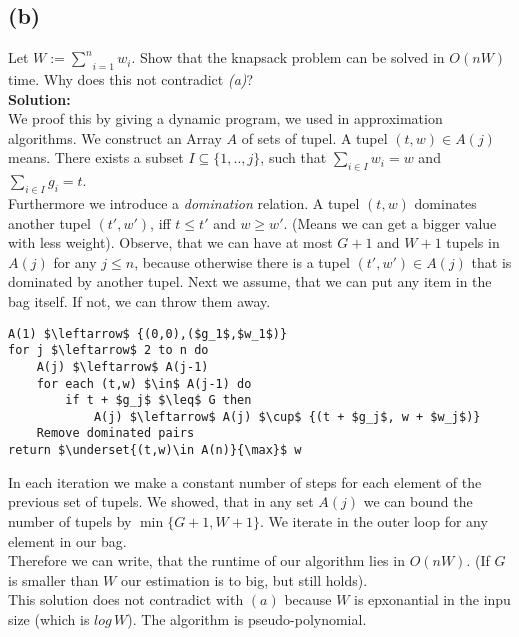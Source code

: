 \subsection*{(b)}

Let $W := \underset{i=1}{\overset{n}{\sum}} w_i$. Show that the knapsack problem can be solved in $O(nW)$ time. Why does this not
contradict \emph{(a)}?\\

\textbf{Solution:}\\
We proof this by giving a dynamic program, we used in approximation algorithms.
We construct an Array $A$ of sets of tupel. A tupel $(t,w) \in A(j)$ means. There exists a 
subset $I \subseteq \{1,..,j \}$, such that $\underset{i \in I}{\sum} w_i = w$ and $\underset{i \in I}{\sum} g_i = t$.\\

Furthermore we introduce a \emph{domination} relation. A tupel $(t,w)$ dominates another tupel $(t',w')$, iff $t \leq t'$ and $w \geq w'$.
(Means we can get a bigger value with less weight).
Observe, that we can have at most $G+1$ and $W+1$ tupels in $A(j)$ for any $j\leq n$, because otherwise there is a tupel $(t',w') \in A(j)$
that is dominated by another tupel.
Next we assume, that we can put any item in the bag itself. If not, we can throw them away.

\begin{lstlisting}[float=tbh]
A(1) $\leftarrow$ {(0,0),($g_1$,$w_1$)}
for j $\leftarrow$ 2 to n do
    A(j) $\leftarrow$ A(j-1)
    for each (t,w) $\in$ A(j-1) do
        if t + $g_j$ $\leq$ G then
            A(j) $\leftarrow$ A(j) $\cup$ {(t + $g_j$, w + $w_j$)}
    Remove dominated pairs
return $\underset{(t,w)\in A(n)}{\max}$ w
\end{lstlisting}

In each iteration we make a constant number of steps for each element of the previous set of tupels. We showed, that in any set $A(j)$ we can bound
the number of tupels by $\min \{ G + 1, W + 1 \}$. We iterate in the outer loop for any element in our bag. \\

Therefore we can write, that the runtime of our algorithm lies in $O(nW)$. (If $G$ is smaller than $W$ our estimation is to big, but still holds).\\

This solution does not contradict with $(a)$ because $W$ is epxonantial in the inpu size (which is $log \, W$). The algorithm is pseudo-polynomial.

